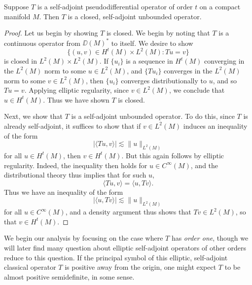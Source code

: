 \begin{theorem}
    Suppose $T$ is a self-adjoint pseudodifferential operator of order $t$ on a compact manifold $M$. Then $T$ is a closed, self-adjoint unbounded operator.
\end{theorem}
\begin{proof}
    Let us begin by showing $T$ is closed. We begin by noting that $T$ is a continuous operator from $\DD(M)^*$ to itself. We desire to show
    \[ \{ (u,v) \in H^t(M) \times L^2(M) : Tu = v \} \]
    is closed in $L^2(M) \times L^2(M)$. If $\{ u_i \}$ is a sequence in $H^t(M)$ converging in the $L^2(M)$ norm to some $u \in L^2(M)$, and $\{ Tu_i \}$ converges in the $L^2(M)$ norm to some $v \in L^2(M)$, then $\{ u_i \}$ converges distributionally to $u$, and so $Tu = v$. Applying elliptic regularity, since $v \in L^2(M)$, we conclude that $u \in H^t(M)$. Thus we have shown $T$ is closed.

    Next, we show that $T$ is a self-adjoint unbounded operator. To do this, since $T$ is already self-adjoint, it suffices to show that if $v \in L^2(M)$ induces an inequality of the form
    \[ |\langle Tu, v \rangle| \lesssim \| u \|_{L^2(M)} \]
    for all $u \in H^t(M)$, then $v \in H^t(M)$. But this again follows by elliptic regularity. Indeed, the inequality then holds for $u \in C^\infty(M)$, and the distributional theory thus implies that for such $u$,
    \[ \langle Tu, v \rangle = \langle u, Tv \rangle. \]
    Thus we have an inequality of the form
    \[ |\langle u, Tv \rangle| \lesssim \| u \|_{L^2(M)} \]
    for all $u \in C^\infty(M)$, and a density argument thus shows that $Tv \in L^2(M)$, so that $v \in H^t(M)$.
\end{proof}

We begin our analysis by focusing on the case where $T$ has \emph{order one}, though we will later find many question about elliptic self-adjoint operators of other orders reduce to this question. If the principal symbol of this elliptic, self-adjoint classical operator $T$ is positive away from the origin, one might expect $T$ to be almost positive semidefinite, in some sense.

